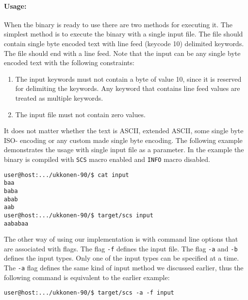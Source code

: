 \documentclass[english,twoside,censored,csm,algorithms-track-2020]{HYthesisML}
\theoremstyle{plain}
\theoremstyle{definition}
\begin{document}
\paragraph{Usage:}
When the binary is ready to use there are two methods for executing it. The simplest method is to
execute the binary with a single input file. The file should contain single byte encoded text with
line feed (keycode 10) delimited keywords. The file should end with a line feed. Note that the input
can be any single byte encoded text with the following constraints:

\begin{enumerate}
\item The input keywords must not contain a byte of value 10, since it is reserved for delimiting the
  keywords. Any keyword that contains line feed values are treated as multiple
  keywords.
\item The input file must not contain zero values.
\end{enumerate}

It does not matter whether the text is ASCII, extended ASCII, some single byte ISO- encoding or any
custom made single byte encoding. The following example demonstrates the usage with single input
file as a parameter. In the example the binary is compiled with \texttt{SCS} macro enabled and
\texttt{INFO} macro disabled.

\begin{verbatim}
user@host:.../ukkonen-90/$ cat input
baa
baba
abab
aab
user@host:.../ukkonen-90/$ target/scs input
aababaa
\end{verbatim}

The other way of using our implementation is with command line options that are associated with
flags. The flag \texttt{-f} defines the input file. The flag \texttt{-a} and \texttt{-b} defines
the input types. Only one of the
input types can be specified at a time. The \texttt{-a} flag defines the same kind of input method
we discussed earlier, thus the following command is equivalent to the earlier example:

\begin{verbatim}
user@host:.../ukkonen-90/$ target/scs -a -f input
\end{verbatim}
\end{document}
